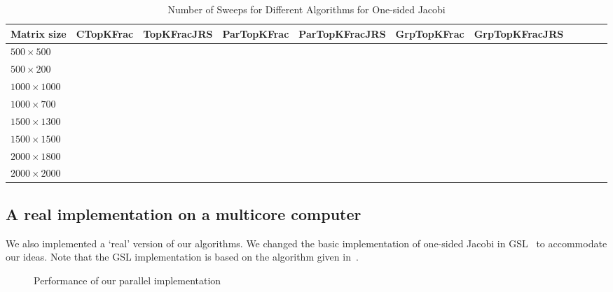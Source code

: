 \documentclass[10pt, conference, compsocconf]{IEEEtran}
\begin{document}
\begin{table}
  \centering
  \caption{Number of Sweeps for Different Algorithms for One-sided Jacobi}
  \label{tab:varyk}
  \begin{tabular}{lcccccccccc}
    \toprule
    Matrix size & CTopKFrac & TopKFracJRS & ParTopKFrac & ParTopKFracJRS & GrpTopKFrac & GrpTopKFracJRS \\
    \midrule
    $500 \times 500$   &  \\
    $500 \times 200$   &  \\
    $1000 \times 1000$ &  \\
    $1000 \times 700$  &  \\
    $1500 \times 1300$ &  \\
    $1500 \times 1500$ &  \\
    $2000 \times 1800$ &  \\
    $2000 \times 2000$ &  \\
    \bottomrule
  \end{tabular}
\end{table}


\subsection{A real implementation on a multicore computer}

We also implemented a `real' version of our algorithms. We changed the basic implementation of one-sided Jacobi in GSL~\cite{galassi1996gnu} to accommodate our ideas. Note that the GSL implementation is based on the algorithm given in~\cite{nash1975one}.



\begin{figure}[!htb]
\centering
{} \hfill
{}
\caption{Performance of our parallel implementation}
\end{figure}
\end{document}
